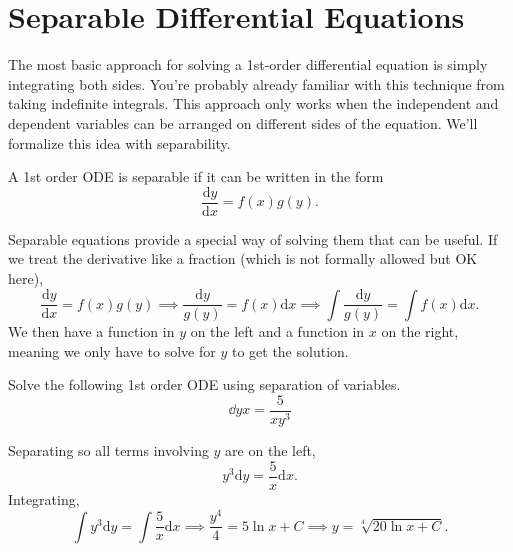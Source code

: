 \section{Separable Differential Equations}
\noindent
The most basic approach for solving a 1st-order differential equation is simply integrating both sides.
You're probably already familiar with this technique from taking indefinite integrals.
This approach only works when the independent and dependent variables can be arranged on different sides of the equation. 
We'll formalize this idea with separability.

\begin{definition}
	A 1st order ODE is separable if it can be written in the form
	\begin{equation*}
		\frac{\mathrm{d} y}{\mathrm{d} x} = f(x)g(y).
	\end{equation*}
\end{definition}

\noindent
Separable equations provide a special way of solving them that can be useful.
If we treat the derivative like a fraction (which is not formally allowed but OK here),
\begin{equation*}
	\frac{\mathrm{d} y}{\mathrm{d} x} = f(x)g(y) \implies \frac{\mathrm{d} y}{g(y)} = f(x) \mathrm{d}x \implies \int{\frac{\mathrm{d} y}{g(y)}} = \int{f(x) \mathrm{d}x}.
\end{equation*}
We then have a function in $y$ on the left and a function in $x$ on the right, meaning we only have to solve for $y$ to get the solution.

\begin{example}
	Solve the following 1st order ODE using separation of variables.
	\begin{equation*}
		\dd{y}{x} = \frac{5}{xy^3}
	\end{equation*}
\end{example}
\noindent
Separating so all terms involving $y$ are on the left,
\begin{equation*}
	y^3 \mathrm{d}y = \frac{5}{x} \mathrm{d}x.
\end{equation*}
Integrating,
\begin{equation*}
	\int{y^3 \mathrm{d}y} = \int{\frac{5}{x} \mathrm{d}x} \implies \frac{y^4}{4} = 5\ln{x} + C \implies y = \sqrt[4]{20\ln{x} + C}.
\end{equation*}

